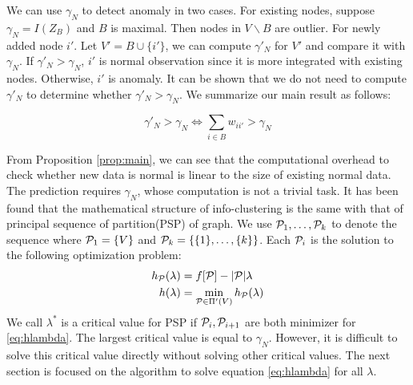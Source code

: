 \documentclass[runningheads]{llncs}
\begin{document}
We can use $\gamma_N$ to detect anomaly in two cases. For existing nodes, suppose $\gamma_N=I(Z_B)$ and $B$ is maximal. Then nodes in $V\backslash B$  are outlier. For newly added node $i'$. Let $V'=B\cup \{i'\}$, we can compute $\gamma'_N$ for $V'$ and compare it with $\gamma_N$. If $\gamma'_N>\gamma_N$, $i'$ is normal observation since it is more integrated with existing nodes. Otherwise, $i'$ is anomaly. It can be shown that we do not need to compute $\gamma'_N$ to determine whether $\gamma'_N>\gamma_N$. We summarize our main result as follows:
\begin{proposition}\label{prop:main}
\begin{equation}
\gamma'_N > \gamma_N \iff  \sum_{i \in B} w_{ii'} > \gamma_N 
\end{equation}
\end{proposition}
From Proposition \ref{prop:main}, we can see that the computational overhead to check whether new data is normal is linear to the size of existing normal data. 
The prediction requires $\gamma_N$, whose computation is not a trivial task. It has been found that the mathematical structure of info-clustering is the same with that of principal sequence of partition(PSP) of graph. We use $\P_1, \dots, \P_k$ to denote the sequence where $\P_1 = \{V\}$ and $\P_k = \{\{1\},\dots,\{k\}\}$.
Each $\P_i$ is the solution to the following optimization problem:
\begin{align}
h_{\P}(\lambda) &=  f[\P] - \abs{\P} \lambda  \label{eq:hPL}\\
h(\lambda) &= \min_{\P \in \Pi'(V)} h_{\P}(\lambda) \label{eq:hlambda}
\end{align}
We call $\lambda^*$ is a critical value for PSP if $\P_i, \P_{i+1}$ are both minimizer for \eqref{eq:hlambda}.
The largest critical value is equal to $\gamma_N$. However, it is difficult to solve this critical value directly without solving other critical values. The next section is focused on the algorithm to solve equation \eqref{eq:hlambda} for all $\lambda$.
\end{document}
